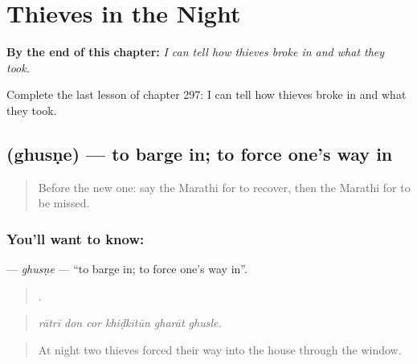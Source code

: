 
\chapter{Thieves in the Night}
\label{ch:mr-thieves-in-the-night}

\begin{chapteropening}
\textbf{By the end of this chapter:} \emph{I can tell how thieves broke in and what they took.}

Complete the last lesson of chapter 297: I can tell how thieves broke in and what they took.
\end{chapteropening}

\section[\texorpdfstring{\mr{घुसणे} (ghusṇe)}{घुसणे (ghusṇe)}]{ (ghusṇe) — to barge in; to force one's way in}

\label{lesson:MR-C297-ghusne}



\begin{quote}
Before the new one: say the Marathi for to recover, then the Marathi for to be missed.
\end{quote}

\subsection*{You'll want to know: }
\textbf{} — \emph{ghusṇe} — \textquotedblleft{}to barge in; to force one's way in\textquotedblright{}.

\begin{quote}
     .
\end{quote}

\begin{quote}
\emph{rātrī don cor khiḍkītūn gharāt ghusle.}
\end{quote}

\begin{quote}
At night two thieves forced their way into the house through the window.
\end{quote}

